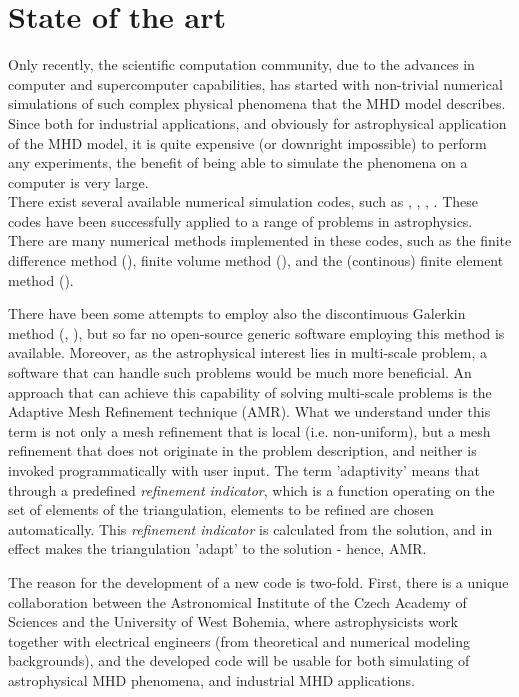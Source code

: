 \section{State of the art}
Only recently, the scientific computation community, due to the advances in computer and supercomputer capabilities, has started with non-trivial numerical simulations of such complex physical phenomena that the MHD model describes. Since both for industrial applications, and obviously for astrophysical application of the MHD model, it is quite expensive (or downright impossible) to perform any experiments, the benefit of being able to simulate the phenomena on a computer is very large.\\
There exist several available numerical simulation codes, such as \citep{athena}, \citep{zeus}, \citep{ramses}, \citep{honzaFD}. These codes have been successfully applied to a range of problems in astrophysics.\\
There are many numerical methods implemented in these codes, such as the finite difference method (\citep{honzaFD}), finite volume method (\citep{ramses}), and the (continous) finite element method (\citep{honzaFem}).

There have been some attempts to employ also the discontinuous Galerkin method (\citep{mhdDg}, \citep{mhdDg2}), but so far no open-source generic software employing this method is available. Moreover, as the astrophysical interest lies in multi-scale problem, a software that can handle such problems would be much more beneficial. An approach that can achieve this capability of solving multi-scale problems is the Adaptive Mesh Refinement technique (AMR). What we understand under this term is not only a mesh refinement that is local (i.e. non-uniform), but a mesh refinement that does not originate in the problem description, and neither is invoked programmatically with user input. The term 'adaptivity' means that through a predefined \textit{refinement indicator}, which is a function operating on the set of elements of the triangulation, elements to be refined are chosen automatically. This \textit{refinement indicator} is calculated from the solution, and in effect makes the triangulation 'adapt' to the solution - hence, AMR.

The reason for the development of a new code is two-fold. First, there is a unique collaboration between the Astronomical Institute of the Czech Academy of Sciences and the University of West Bohemia, where astrophysicists work together with electrical engineers (from theoretical and numerical modeling backgrounds), and the developed code will be usable for both simulating of astrophysical MHD phenomena, and industrial MHD applications.
